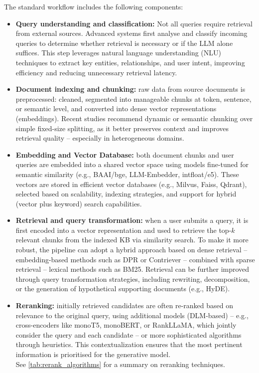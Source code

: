 \begin{spacing}{1.5}
The standard workflow includes the following components:
\begin{itemize}
  \item \textbf{Query understanding and classification:} Not all queries require retrieval from external sources. Advanced systems first analyse and classify incoming queries to determine whether retrieval is necessary or if the LLM alone suffices. This step leverages natural language understanding (NLU) techniques to extract key entities, relationships, and user intent, improving efficiency and reducing unnecessary retrieval latency.
    \item \textbf{Document indexing and chunking:} raw data from source documents is preprocessed: cleaned, segmented into manageable chunks at token, sentence, or semantic level, and converted into dense vector representations (embeddings). Recent studies recommend dynamic or semantic chunking over simple fixed-size splitting, as it better preserves context and improves retrieval quality -- especially in heterogeneous domains.
    \item \textbf{Embedding and Vector Database:} both document chunks and user queries are embedded into a shared vector space using models fine-tuned for semantic similarity (e.g., BAAI/bge, LLM-Embedder, intfloat/e5). These vectors are stored in efficient vector databases (e.g., Milvus, Faiss, Qdrant), selected based on scalability, indexing strategies, and support for hybrid (vector plus keyword) search capabilities.
    \item \textbf{Retrieval and query transformation:} when a user submits a query, it is first encoded into a vector representation and used to retrieve the top-$k$ relevant chunks from the indexed KB via similarity search. To make it more robust, the pipeline can adopt a hybrid approach based on dense retrieval -- embedding-based methods such as DPR or Contriever -- combined with sparse retrieval -- lexical methods such as BM25. Retrieval can be further improved through query transformation strategies, including rewriting, decomposition, or the generation of hypothetical supporting documents (e.g., HyDE).
    \item \textbf{Reranking:} initially retrieved candidates are often re-ranked based on relevance to the original query, using additional models (DLM-based) -- e.g., cross-encoders like monoT5, monoBERT, or RankLLaMA, which jointly consider the query and each candidate -- or more sophisticated algorithms through heuristics. This contextualization ensures that the most pertinent information is prioritised for the generative model.\\See \autoref{tab:rerank_algorithms} for a summary on reranking techniques.

\end{itemize}
\end{spacing}
